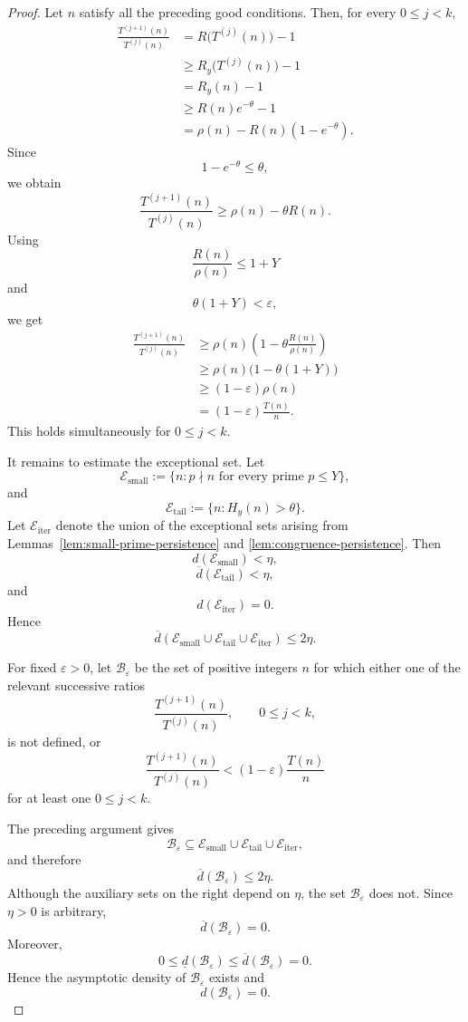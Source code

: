 \documentclass{article}
\begin{document}
\begin{proof}
Let $n$ satisfy all the preceding good conditions. Then, for every
$0\le j<k$,
\[
\begin{aligned}
\frac{T^{(j+1)}(n)}{T^{(j)}(n)}
&=
R\bigl(T^{(j)}(n)\bigr)-1\\
&\ge
R_y\bigl(T^{(j)}(n)\bigr)-1\\
&=
R_y(n)-1\\
&\ge
R(n)e^{-\theta}-1\\
&=
\rho(n)-R(n)(1-e^{-\theta}).
\end{aligned}
\]
Since
\[
1-e^{-\theta}\le\theta,
\]
we obtain
\[
\frac{T^{(j+1)}(n)}{T^{(j)}(n)}
\ge
\rho(n)-\theta R(n).
\]
Using
\[
\frac{R(n)}{\rho(n)}
\le
1+Y
\]
and
\[
\theta(1+Y)<\varepsilon,
\]
we get
\[
\begin{aligned}
\frac{T^{(j+1)}(n)}{T^{(j)}(n)}
&\ge
\rho(n)
\left(
1-\theta\frac{R(n)}{\rho(n)}
\right)\\
&\ge
\rho(n)\bigl(1-\theta(1+Y)\bigr)\\
&\ge
(1-\varepsilon)\rho(n)\\
&=
(1-\varepsilon)\frac{T(n)}n.
\end{aligned}
\]
This holds simultaneously for $0\le j<k$.

It remains to estimate the exceptional set. Let
\[
\mathcal E_{\mathrm{small}}
:=
\{n:p\nmid n\text{ for every prime }p\le Y\},
\]
and
\[
\mathcal E_{\mathrm{tail}}
:=
\{n:H_y(n)>\theta\}.
\]
Let $\mathcal E_{\mathrm{iter}}$ denote the union of the exceptional
sets arising from Lemmas~\ref{lem:small-prime-persistence} and
\ref{lem:congruence-persistence}. Then
\[
d(\mathcal E_{\mathrm{small}})<\eta,
\]
\[
\overline d(\mathcal E_{\mathrm{tail}})<\eta,
\]
and
\[
d(\mathcal E_{\mathrm{iter}})=0.
\]
Hence
\[
\overline d
\left(
\mathcal E_{\mathrm{small}}
\cup
\mathcal E_{\mathrm{tail}}
\cup
\mathcal E_{\mathrm{iter}}
\right)
\le
2\eta.
\]

For fixed $\varepsilon>0$, let $\mathcal B_\varepsilon$ be the set
of positive integers $n$ for which either one of the relevant
successive ratios
\[
\frac{T^{(j+1)}(n)}{T^{(j)}(n)},
\qquad
0\le j<k,
\]
is not defined, or
\[
\frac{T^{(j+1)}(n)}{T^{(j)}(n)}
<
(1-\varepsilon)\frac{T(n)}n
\]
for at least one $0\le j<k$.

The preceding argument gives
\[
\mathcal B_\varepsilon
\subseteq
\mathcal E_{\mathrm{small}}
\cup
\mathcal E_{\mathrm{tail}}
\cup
\mathcal E_{\mathrm{iter}},
\]
and therefore
\[
\overline d(\mathcal B_\varepsilon)
\le
2\eta.
\]
Although the auxiliary sets on the right depend on $\eta$, the set
$\mathcal B_\varepsilon$ does not. Since $\eta>0$ is arbitrary,
\[
\overline d(\mathcal B_\varepsilon)=0.
\]
Moreover,
\[
0\leq \underline d(\mathcal B_\varepsilon)
\leq \overline d(\mathcal B_\varepsilon)=0.
\]
Hence the asymptotic density of $\mathcal B_\varepsilon$ exists and
\[
d(\mathcal B_\varepsilon)=0.
\]


\end{proof}
\end{document}
